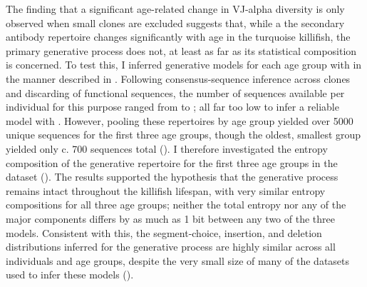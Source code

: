 The finding that a significant age-related change in VJ-alpha diversity is only observed when small clones are excluded suggests that, while a the secondary antibody repertoire changes significantly with age in the turquoise killifish, the primary generative process does not, at least as far as its statistical composition is concerned. To test this, I inferred generative models for each age group with  in the manner described in . Following consensus-sequence inference across clones and discarding of functional sequences, the number of sequences available per individual for this purpose ranged from  to ; all far too low to infer a reliable model with . However, pooling these repertoires by age group yielded over 5000 unique sequences for the first three age groups, though the oldest, smallest group yielded only c. 700 sequences total (). I therefore investigated the entropy composition of the generative repertoire for the first three age groups in the dataset (). The results supported the hypothesis that the generative process remains intact throughout the killifish lifespan, with very similar entropy compositions for all three age groups; neither the total entropy nor any of the major components differs by as much as 1 bit between any two of the three models. Consistent with this, the segment-choice, insertion, and deletion distributions inferred for the generative process are highly similar across all individuals and age groups, despite the very small size of many of the datasets used to infer these models ().

